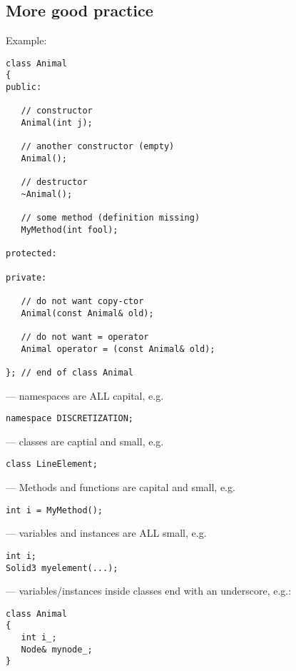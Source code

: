 \subsection{More good practice}
Example:\\
\begin{minipage}{0.45\linewidth}
\begin{boxedminipage}{\linewidth}
\begin{verbatim}
class Animal
{
public:

   // constructor
   Animal(int j);

   // another constructor (empty)
   Animal();

   // destructor
   ~Animal();

   // some method (definition missing)
   MyMethod(int fool);

protected:

private:

   // do not want copy-ctor
   Animal(const Animal& old);

   // do not want = operator
   Animal operator = (const Animal& old);

}; // end of class Animal
\end{verbatim}
\end{boxedminipage}
\end{minipage}
\hfill
\begin{minipage}{0.45\linewidth}
--- namespaces are ALL capital, e.g.
\begin{verbatim}
namespace DISCRETIZATION;
\end{verbatim}

--- classes are captial and small, e.g.
\begin{verbatim}
class LineElement;
\end{verbatim}

--- Methods and functions are
capital and small, e.g.
\begin{verbatim}
int i = MyMethod();
\end{verbatim}

--- variables and instances are ALL
small, e.g.
\begin{verbatim}
int i;
Solid3 myelement(...);
\end{verbatim}

--- variables/instances inside classes
end with an underscore, e.g.:
\begin{verbatim}
class Animal
{
   int i_;
   Node& mynode_;
}
\end{verbatim}
\end{minipage}

